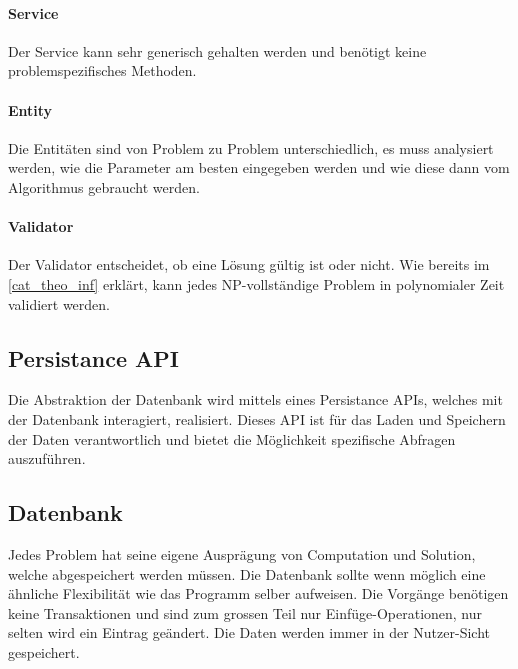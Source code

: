 \paragraph{Service}
Der Service kann sehr generisch gehalten werden und benötigt keine problemspezifisches Methoden. 
\paragraph{Entity}
Die Entitäten sind von Problem zu Problem unterschiedlich, es muss analysiert werden, wie die Parameter am besten eingegeben werden und wie diese dann vom Algorithmus 
gebraucht werden. 
\paragraph{Validator}
Der Validator entscheidet, ob eine Lösung gültig ist oder nicht. Wie bereits im \autoref{cat_theo_inf} erklärt, kann jedes NP-vollständige Problem in polynomialer Zeit validiert werden.

\subsection{Persistance API}
Die Abstraktion der Datenbank wird mittels eines Persistance APIs, welches mit der Datenbank interagiert, realisiert. Dieses API ist für das Laden und Speichern der Daten 
verantwortlich und bietet die Möglichkeit spezifische Abfragen auszuführen.

\subsection{Datenbank}
Jedes Problem hat seine eigene Ausprägung von Computation und Solution, welche abgespeichert werden müssen. Die Datenbank sollte wenn möglich eine ähnliche Flexibilität wie 
das Programm selber aufweisen. Die Vorgänge benötigen keine Transaktionen und sind zum grossen Teil nur Einfüge-Operationen, nur selten wird ein Eintrag geändert. Die Daten werden 
immer in der Nutzer-Sicht gespeichert.

